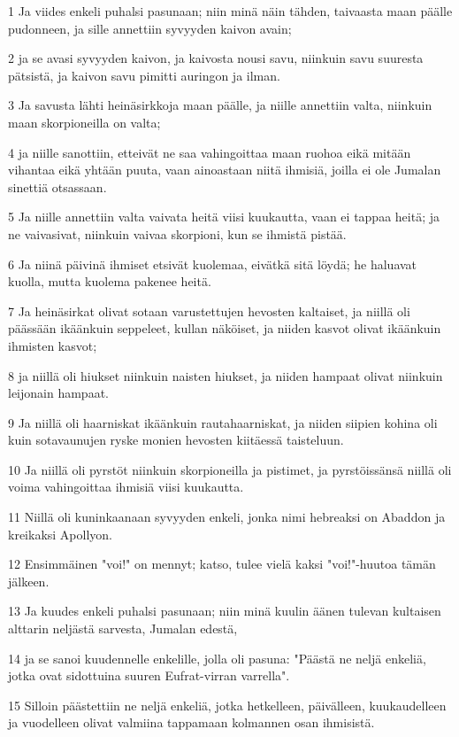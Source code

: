 \par 1 Ja viides enkeli puhalsi pasunaan; niin minä näin tähden, taivaasta maan päälle pudonneen, ja sille annettiin syvyyden kaivon avain;
\par 2 ja se avasi syvyyden kaivon, ja kaivosta nousi savu, niinkuin savu suuresta pätsistä, ja kaivon savu pimitti auringon ja ilman.
\par 3 Ja savusta lähti heinäsirkkoja maan päälle, ja niille annettiin valta, niinkuin maan skorpioneilla on valta;
\par 4 ja niille sanottiin, etteivät ne saa vahingoittaa maan ruohoa eikä mitään vihantaa eikä yhtään puuta, vaan ainoastaan niitä ihmisiä, joilla ei ole Jumalan sinettiä otsassaan.
\par 5 Ja niille annettiin valta vaivata heitä viisi kuukautta, vaan ei tappaa heitä; ja ne vaivasivat, niinkuin vaivaa skorpioni, kun se ihmistä pistää.
\par 6 Ja niinä päivinä ihmiset etsivät kuolemaa, eivätkä sitä löydä; he haluavat kuolla, mutta kuolema pakenee heitä.
\par 7 Ja heinäsirkat olivat sotaan varustettujen hevosten kaltaiset, ja niillä oli päässään ikäänkuin seppeleet, kullan näköiset, ja niiden kasvot olivat ikäänkuin ihmisten kasvot;
\par 8 ja niillä oli hiukset niinkuin naisten hiukset, ja niiden hampaat olivat niinkuin leijonain hampaat.
\par 9 Ja niillä oli haarniskat ikäänkuin rautahaarniskat, ja niiden siipien kohina oli kuin sotavaunujen ryske monien hevosten kiitäessä taisteluun.
\par 10 Ja niillä oli pyrstöt niinkuin skorpioneilla ja pistimet, ja pyrstöissänsä niillä oli voima vahingoittaa ihmisiä viisi kuukautta.
\par 11 Niillä oli kuninkaanaan syvyyden enkeli, jonka nimi hebreaksi on Abaddon ja kreikaksi Apollyon.
\par 12 Ensimmäinen "voi!" on mennyt; katso, tulee vielä kaksi "voi!"-huutoa tämän jälkeen.
\par 13 Ja kuudes enkeli puhalsi pasunaan; niin minä kuulin äänen tulevan kultaisen alttarin neljästä sarvesta, Jumalan edestä,
\par 14 ja se sanoi kuudennelle enkelille, jolla oli pasuna: "Päästä ne neljä enkeliä, jotka ovat sidottuina suuren Eufrat-virran varrella".
\par 15 Silloin päästettiin ne neljä enkeliä, jotka hetkelleen, päivälleen, kuukaudelleen ja vuodelleen olivat valmiina tappamaan kolmannen osan ihmisistä.
